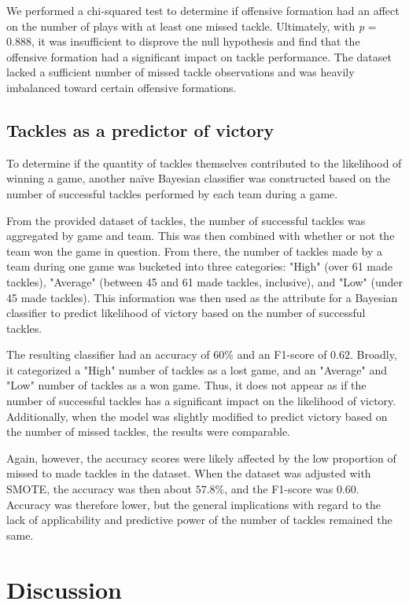 \documentclass[bibtex, sigconf, hyperref={colorlinks=true,linkcolor=blue,urlcolor=blue}]{acmart}
\begin{document}
We performed a chi-squared test to determine if offensive formation had an
affect on the number of plays with at least one missed tackle. Ultimately, with
\textit{p} = 0.888, it was insufficient to disprove the null hypothesis and find
that the offensive formation had a significant impact on tackle performance. The
dataset lacked a sufficient number of missed tackle observations and was heavily
imbalanced toward certain offensive formations.

\subsection{Tackles as a predictor of victory}

To determine if the quantity of tackles themselves contributed to the
likelihood of winning a game, another na\"ive Bayesian classifier was
constructed based on the number of successful tackles performed by each team
during a game.

From the provided dataset of tackles, the number of successful tackles was
aggregated by game and team. This was then combined with whether or not the
team won the game in question. From there, the number of tackles made by a team
during one game was bucketed into three categories: "High" (over 61 made
tackles), "Average" (between 45 and 61 made tackles, inclusive), and "Low"
(under 45 made tackles). This information was then used as the attribute for a
Bayesian classifier to predict likelihood of victory based on the number of
successful tackles.

The resulting classifier had an accuracy of $60\%$ and an F1-score of
$0.62$. Broadly, it categorized a "High" number of tackles as a
lost game, and an "Average" and "Low" number of tackles as a won game. Thus, it
does not appear as if the number of successful tackles has a significant impact
on the likelihood of victory. Additionally, when the model was slightly
modified to predict victory based on the number of missed tackles, the results
were comparable.

Again, however, the accuracy scores were likely affected by the low proportion
of missed to made tackles in the dataset. When the dataset was adjusted with
SMOTE, the accuracy was then about $57.8\%$, and the F1-score was
$0.60$. Accuracy was therefore lower, but the general
implications with regard to the lack of applicability and predictive power of
the number of tackles remained the same.

\section{Discussion}
\end{document}

